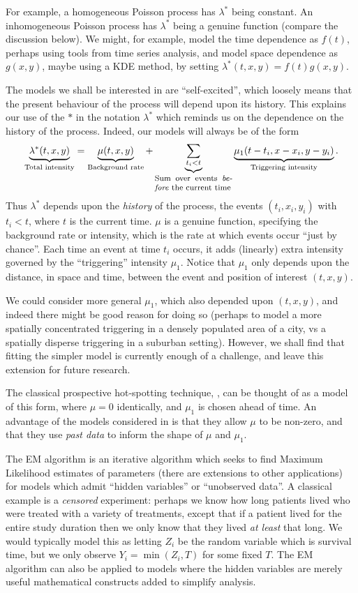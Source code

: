 \documentclass[twoside,a4paper]{article}
\theoremstyle{plain}
\theoremstyle{definition}
\begin{document}
For example, a homogeneous Poisson process has $\lambda^*$ being constant.  An inhomogeneous
Poisson process has $\lambda^*$ being a genuine function (compare the discussion below).
We might, for example, model the time dependence as $f(t)$, perhaps using tools from time
series analysis, and model space dependence as $g(x,y)$, maybe using a KDE method, by setting
$\lambda^*(t,x,y) = f(t) g(x,y)$.

The models we shall be interested in are ``self-excited'', which loosely means that the present
behaviour of the process will depend upon its history.  This explains our use of the $*$ in
the notation $\lambda^*$ which reminds us on the dependence on the history of the process.
Indeed, our models will always be of the form
\[ \underbrace{\lambda^*(t,x,y)}_{\text{Total intensity}}
= \underbrace{\mu(t,x,y)}_{\text{Background rate}}
+ \underbrace{\sum_{t_i < t}}_{\parbox{1.1in}{\footnotesize Sum over events \emph{before} the current time}}
\underbrace{\mu_1(t-t_i, x-x_i, y-y_i)}_{\text{Triggering intensity}}. \]
Thus $\lambda^*$ depends upon the \emph{history} of the process, the events $(t_i,x_i,y_i)$
with $t_i<t$, where $t$ is the current time.  $\mu$ is a genuine function, specifying the
background rate or intensity, which is the rate at which events occur ``just by
chance''.  Each time an event at time $t_i$ occurs, it adds (linearly) extra intensity
governed by the ``triggering'' intensity $\mu_1$.  Notice that $\mu_1$ only depends upon
the distance, in space and time, between the event and position of interest $(t,x,y)$.

We could consider more general $\mu_1$, which also depended upon $(t,x,y)$, and indeed there
might be good reason for doing so (perhaps to model a more spatially concentrated
triggering in a densely populated area of a city, vs a spatially disperse triggering
in a suburban setting).  However, we shall find that fitting the simpler model is
currently enough of a challenge, and leave this extension for future research.

The classical prospective hot-spotting technique, \cite{bjp}, can be thought of as a model
of this form, where $\mu=0$ identically, and $\mu_1$ is chosen ahead of time.  An
advantage of the models considered in \cite{sepp, sepp2} is that they allow $\mu$ to be
non-zero, and that they use \emph{past data} to inform the shape of $\mu$ and $\mu_1$.

The EM algorithm is an iterative algorithm which seeks to find Maximum Likelihood estimates
of parameters (there are extensions to other applications) for models which admit ``hidden
variables'' or ``unobserved data''.  A classical example is a \emph{censored} experiment:
perhaps we know how long patients lived who were treated with a variety of treatments, except
that if a patient lived for the entire study duration then we only know that
they lived \emph{at least} that long.  We would typically model this as letting $Z_i$ be
the random variable which is survival time, but we only observe $Y_i = \min(Z_i, T)$ for
some fixed $T$.  The EM algorithm can also be applied to models where the hidden variables
are merely useful mathematical constructs added to simplify analysis.
\end{document}
